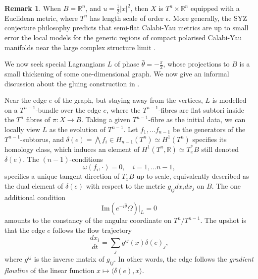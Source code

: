 \documentclass{article}
\theoremstyle{definition}
\newtheorem{rmk}{Remark}
\newcommand{\R}{\mathbb{R}}
\newcommand{\Z}{\mathbb{Z}}
\begin{document}
		
		\begin{rmk}
			When $B=\R^n$, and $u= \frac{1}{2} |x|^2$, 
			then $X$ is $T^n\times \R^n$ 
			equipped with a Euclidean metric, where $T^n$ has length scale of order $\epsilon$. More generally, the SYZ conjecture philosophy \cite{SYZ} predicts that semi-flat Calabi-Yau metrics are up to small error the local models for the generic regions of compact polarised Calabi-Yau manifolds near the large complex structure limit  \cite{Livaluative}. 
		\end{rmk}
		
		
		
		
		We now seek special Lagrangians $L$ of phase $\hat{\theta}=-\frac{\pi}{2}$, whose projections to $B$ is a small thickening of some one-dimensional graph. We now give an informal discussion about the gluing construction in  \cite{ChiuLiLin}. %
		
		
		
		Near the edge $e$ of the graph, but staying away from the vertices, $L$ is modelled on 
		 a $T^{n-1}$-bundle over the edge $e$, where the $T^{n-1}$-fibres are flat subtori inside the $T^n$ fibres of $\pi: X\to B$. Taking a given $T^{n-1}$-fibre as the initial data, we can locally view $L$ as the evolution of $T^{n-1}$. Let $f_1,\ldots f_{n-1}$ be the generators of the $T^{n-1}$-subtorus, and $\delta(e)=\bigwedge f_i\in H_{n-1}(T^n) \simeq H^1(T^n)$ specifies its homology class, which induces an element of $H^1(T^n,\R)\simeq T_x^* B$ still denoted $\delta(e)$. The $(n-1)$-conditions
		\[
		\omega(f_i,\cdot)=0,\quad i=1,\ldots n-1
		,\]
		specifies a unique tangent direction of $T_xB$ up to scale, equivalently described as the dual element of $\delta(e)$ with respect to the metric $g_{ij}dx_idx_j$ on $B$. The one additional condition
		\[
		\text{Im}(e^{-i\hat{\theta}} \Omega)|_L=0
		\]
		amounts to the constancy of the angular coordinate on $T^n/T^{n-1}$. %
		The upshot is that the edge $e$ follows the flow trajectory
		\begin{equation}\label{gradientflow1}
			\frac{dx_i}{dt}=\sum_j g^{ij} (x) \delta(e)_j,
		\end{equation}
		where $g^{ij}$ is the inverse matrix of $g_{ij}$. In other words, the edge follows the \emph{gradient flowline} of the linear function $x\mapsto \langle \delta(e), x\rangle$. 
		
\end{document}
